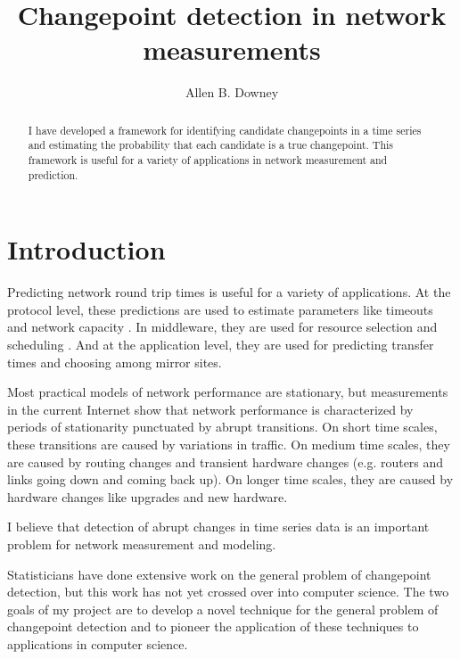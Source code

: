 \documentclass[twocolumn,11pt]{article}
\begin{document}
\title{Changepoint detection in network measurements}

\author{Allen B. Downey}

\maketitle

\begin{abstract}

I have developed a framework for identifying candidate
changepoints in a time series and estimating the probability
that each candidate is a true changepoint.  This framework is
useful for a variety of applications in network measurement and
prediction.

\end{abstract}

\section{Introduction}
\label {intro}

Predicting network round trip times is useful for a variety of
applications.  At the protocol level, these predictions are used to
estimate parameters like timeouts and network capacity
\cite{noureddine02transmission}.  In middleware, they are used for
resource selection and scheduling \cite{wolski99network}. And at the
application level, they are used for predicting transfer times and
choosing among mirror sites.

Most practical models of network performance are stationary, but
measurements in the current Internet show that network performance
is characterized by periods of stationarity punctuated by
abrupt transitions.  On short time scales, these transitions are
caused by variations in traffic.  On medium time scales, they are
caused by routing changes and transient hardware changes (e.g. routers
and links going down and coming back up).  On longer time scales, they
are caused by hardware changes like upgrades and new
hardware.

I believe that detection of abrupt changes in time series
data is an important problem for network measurement and modeling.

Statisticians have done extensive work on the general problem of
changepoint detection, but this work has not yet crossed over into
computer science.  The two goals of my project are to develop a novel
technique for the general problem of changepoint detection and to
pioneer the application of these techniques to applications in
computer science.
\end{document}
